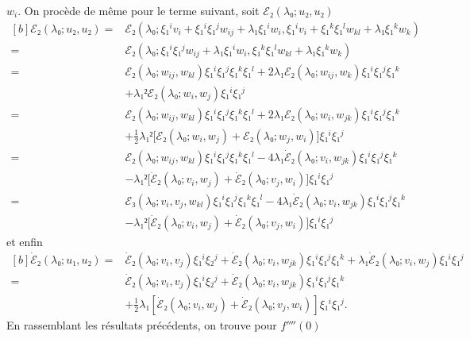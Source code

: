 \documentclass[12pt, final]{scrartcl}
\theoremstyle{definition}
\begin{document}
\(w_i\). On procède de même pour le terme suivant, soit \(ℰ₂(λ₀; u₂, u₂)\)
\begin{equation*}
  \begin{aligned}[b]
    ℰ₂(λ₀; u₂, u₂)
    ={} & ℰ₂(λ₀ ; ξ₁^i v_i + ξ₁^i ξ₁^j w_{i j} + λ₁ ξ₁^i w_i, ξ₁^i v_i + ξ₁^k ξ₁^l w_{k l} + λ₁ ξ₁^k w_k)\\
    ={} & ℰ₂(λ₀; ξ₁^i ξ₁^j w_{i j} + λ₁ ξ₁^i w_i, ξ₁^k ξ₁^l w_{k l} + λ₁ ξ₁^k w_k)\\
    ={} & ℰ₂(λ₀; w_{i j}, w_{k l}) ξ₁^i ξ₁^j ξ₁^k ξ₁^l + 2 λ₁ ℰ₂(λ₀ ; w_{i j}, w_k) ξ₁^i ξ₁^j ξ₁^k\\
    & + λ₁² ℰ₂(λ₀; w_i, w_j) ξ₁^i ξ₁^j\\
    ={} & ℰ₂(λ₀; w_{i j}, w_{k l}) ξ₁^i ξ₁^j ξ₁^k ξ₁^l + 2 λ₁ ℰ₂(λ₀ ; w_i, w_{j k}) ξ₁^i ξ₁^j ξ₁^k\\
    & + \tfrac{1}{2} λ₁² \bigl[ℰ₂(λ₀; w_i, w_j) + ℰ₂(λ₀; w_j, w_i)\bigr] ξ₁^i ξ₁^j\\
    ={} & ℰ₂(λ₀; w_{i j}, w_{k l}) ξ₁^i ξ₁^j ξ₁^k ξ₁^l - 4 λ₁ \dot{ℰ}₂ (λ₀; v_i, w_{j k}) ξ₁^i ξ₁^j ξ₁^k\\
    & - λ₁² \bigl[\dot{ℰ}₂(λ₀; v_i, w_j) + \dot{ℰ}₂(λ₀; v_j, w_i)\bigr] ξ₁^i ξ₁^j\\
    ={} & ℰ₃(λ₀; v_i, v_j, w_{k l}) ξ₁^i ξ₁^j ξ₁^k ξ₁^l - 4 λ₁ \dot{ℰ}₂(λ₀; v_i, w_{j k}) ξ₁^i ξ₁^j ξ₁^k\\
    & - λ₁² \bigl[\dot{ℰ}₂(λ₀; v_i, w_j) + \dot{ℰ}₂(λ₀; v_j, w_i)\bigr] ξ₁^i ξ₁^j
  \end{aligned}
\end{equation*}
et enfin
\begin{equation*}
  \begin{aligned}[b]
    \dot{ℰ}₂(λ₀; u₁, u₂)
    ={} & \dot{ℰ}₂ (λ₀; v_i, v_j) ξ₁^i ξ₂^j + \dot{ℰ}₂(λ₀ ; v_i, w_{j k}) ξ₁^i ξ₁^j ξ₁^k + λ₁ \dot{ℰ}₂(λ₀; v_i, w_j) ξ₁^i ξ₁^j\\
    ={} & \dot{ℰ}₂(λ₀; v_i, v_j) ξ₁^i ξ₂^j + \dot{ℰ}₂(λ₀; v_i, w_{j k}) ξ₁^i ξ₁^j ξ₁^k\\
    & + \tfrac{1}{2} λ₁ [\dot{ℰ}₂(λ₀ ; v_i, w_j) + \dot{ℰ}₂(λ₀; v_j, w_i)] ξ₁^i ξ₁^j.
  \end{aligned}
\end{equation*}
En rassemblant les résultats précédents, on trouve pour \(f''''(0)\)
\end{document}
